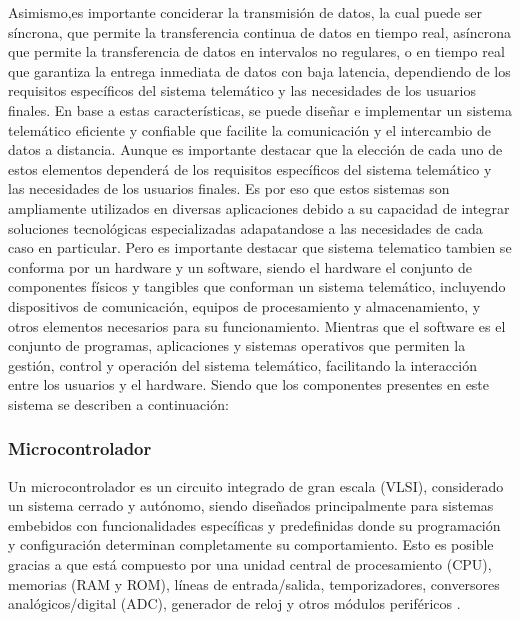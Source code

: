 Asimismo,es importante conciderar la transmisión de datos, la cual puede ser
síncrona, que permite la transferencia continua de datos en tiempo real,
asíncrona que permite la transferencia de datos en intervalos no regulares,
o en tiempo real que garantiza la entrega inmediata de datos con baja latencia,
dependiendo de los requisitos específicos del sistema telemático y las necesidades
de los usuarios finales.\cite{Vine2000}
\newline En base a estas características, se puede diseñar e implementar un sistema telemático
eficiente y confiable que facilite la comunicación y el intercambio de datos a distancia.
Aunque es importante destacar que la elección de cada uno de estos elementos
dependerá de los requisitos específicos del sistema telemático y las necesidades
de los usuarios finales. Es por eso que estos sistemas son ampliamente utilizados en
diversas aplicaciones debido a su capacidad de integrar soluciones tecnológicas especializadas
adapatandose a las necesidades de cada caso en particular.
\newline
Pero es importante destacar que sistema telematico tambien se conforma por un hardware y un software, 
siendo el hardware el conjunto de componentes físicos y tangibles que conforman un sistema telemático,
incluyendo dispositivos de comunicación, equipos de procesamiento y almacenamiento,
y otros elementos necesarios para su funcionamiento. Mientras que el software es el conjunto de programas,
aplicaciones y sistemas operativos que permiten la gestión, control y operación del sistema telemático,
facilitando la interacción entre los usuarios y el hardware.
Siendo que los componentes presentes en este sistema se describen a continuación:

\subsubsection{Microcontrolador}
Un microcontrolador es un circuito integrado de gran escala (VLSI), considerado un
sistema cerrado y autónomo, siendo diseñados principalmente para sistemas
embebidos con funcionalidades específicas y predefinidas donde su programación
y configuración determinan completamente su comportamiento. Esto es posible
gracias a que está compuesto por una unidad central de procesamiento (CPU),
memorias (RAM y ROM), líneas de entrada/salida, temporizadores, conversores
analógicos/digital (ADC), generador de reloj y otros módulos periféricos \cite{Filmus2004}.

